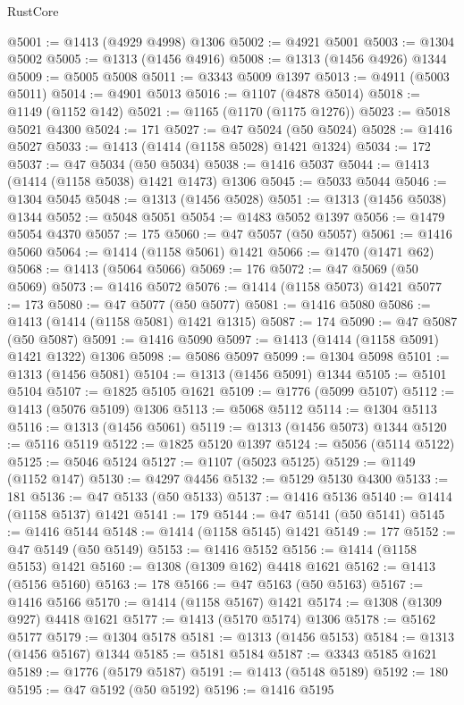\begin{lexlean}{RustCore}
\begin{coremodule}
@5001 := @1413 (@4929 @4998) @1306
@5002 := @4921 @5001
@5003 := @1304 @5002
@5005 := @1313 (@1456 @4916)
@5008 := @1313 (@1456 @4926) @1344
@5009 := @5005 @5008
@5011 := @3343 @5009 @1397
@5013 := @4911 (@5003 @5011)
@5014 := @4901 @5013
@5016 := @1107 (@4878 @5014)
@5018 := @1149 (@1152 @142)
@5021 := @1165 (@1170 (@1175 @1276))
@5023 := @5018 @5021 @4300
@5024 := 171
@5027 := @47 @5024 (@50 @5024)
@5028 := @1416 @5027
@5033 := @1413 (@1414 (@1158 @5028) @1421 @1324)
@5034 := 172
@5037 := @47 @5034 (@50 @5034)
@5038 := @1416 @5037
@5044 := @1413 (@1414 (@1158 @5038) @1421 @1473) @1306
@5045 := @5033 @5044
@5046 := @1304 @5045
@5048 := @1313 (@1456 @5028)
@5051 := @1313 (@1456 @5038) @1344
@5052 := @5048 @5051
@5054 := @1483 @5052 @1397
@5056 := @1479 @5054 @4370
@5057 := 175
@5060 := @47 @5057 (@50 @5057)
@5061 := @1416 @5060
@5064 := @1414 (@1158 @5061) @1421
@5066 := @1470 (@1471 @62)
@5068 := @1413 (@5064 @5066)
@5069 := 176
@5072 := @47 @5069 (@50 @5069)
@5073 := @1416 @5072
@5076 := @1414 (@1158 @5073) @1421
@5077 := 173
@5080 := @47 @5077 (@50 @5077)
@5081 := @1416 @5080
@5086 := @1413 (@1414 (@1158 @5081) @1421 @1315)
@5087 := 174
@5090 := @47 @5087 (@50 @5087)
@5091 := @1416 @5090
@5097 := @1413 (@1414 (@1158 @5091) @1421 @1322) @1306
@5098 := @5086 @5097
@5099 := @1304 @5098
@5101 := @1313 (@1456 @5081)
@5104 := @1313 (@1456 @5091) @1344
@5105 := @5101 @5104
@5107 := @1825 @5105 @1621
@5109 := @1776 (@5099 @5107)
@5112 := @1413 (@5076 @5109) @1306
@5113 := @5068 @5112
@5114 := @1304 @5113
@5116 := @1313 (@1456 @5061)
@5119 := @1313 (@1456 @5073) @1344
@5120 := @5116 @5119
@5122 := @1825 @5120 @1397
@5124 := @5056 (@5114 @5122)
@5125 := @5046 @5124
@5127 := @1107 (@5023 @5125)
@5129 := @1149 (@1152 @147)
@5130 := @4297 @4456
@5132 := @5129 @5130 @4300
@5133 := 181
@5136 := @47 @5133 (@50 @5133)
@5137 := @1416 @5136
@5140 := @1414 (@1158 @5137) @1421
@5141 := 179
@5144 := @47 @5141 (@50 @5141)
@5145 := @1416 @5144
@5148 := @1414 (@1158 @5145) @1421
@5149 := 177
@5152 := @47 @5149 (@50 @5149)
@5153 := @1416 @5152
@5156 := @1414 (@1158 @5153) @1421
@5160 := @1308 (@1309 @162) @4418 @1621
@5162 := @1413 (@5156 @5160)
@5163 := 178
@5166 := @47 @5163 (@50 @5163)
@5167 := @1416 @5166
@5170 := @1414 (@1158 @5167) @1421
@5174 := @1308 (@1309 @927) @4418 @1621
@5177 := @1413 (@5170 @5174) @1306
@5178 := @5162 @5177
@5179 := @1304 @5178
@5181 := @1313 (@1456 @5153)
@5184 := @1313 (@1456 @5167) @1344
@5185 := @5181 @5184
@5187 := @3343 @5185 @1621
@5189 := @1776 (@5179 @5187)
@5191 := @1413 (@5148 @5189)
@5192 := 180
@5195 := @47 @5192 (@50 @5192)
@5196 := @1416 @5195

\end{coremodule}
\end{lexlean}
